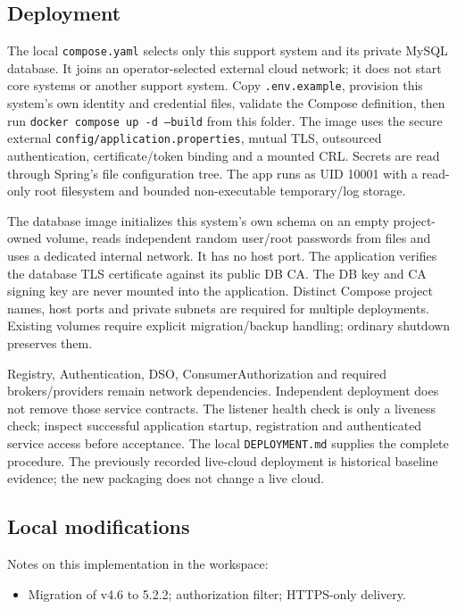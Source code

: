 \documentclass[a4paper]{arrowhead}
\begin{document}
\subsection{Deployment}

The local \texttt{compose.yaml} selects only this support system and its private MySQL database. It joins an operator-selected external cloud network; it does not start core systems or another support system. Copy \texttt{.env.example}, provision this system's own identity and credential files, validate the Compose definition, then run \texttt{docker compose up -d --build} from this folder. The image uses the secure external \texttt{config/application.properties}, mutual TLS, outsourced authentication, certificate/token binding and a mounted CRL. Secrets are read through Spring's file configuration tree. The app runs as UID 10001 with a read-only root filesystem and bounded non-executable temporary/log storage.

The database image initializes this system's own schema on an empty project-owned volume, reads independent random user/root passwords from files and uses a dedicated internal network. It has no host port. The application verifies the database TLS certificate against its public DB CA. The DB key and CA signing key are never mounted into the application. Distinct Compose project names, host ports and private subnets are required for multiple deployments. Existing volumes require explicit migration/backup handling; ordinary shutdown preserves them.

Registry, Authentication, DSO, ConsumerAuthorization and required brokers/providers remain network dependencies. Independent deployment does not remove those service contracts. The listener health check is only a liveness check; inspect successful application startup, registration and authenticated service access before acceptance. The local \texttt{DEPLOYMENT.md} supplies the complete procedure. The previously recorded live-cloud deployment is historical baseline evidence; the new packaging does not change a live cloud.

\subsection{Local modifications}
\label{sec:local}

Notes on this implementation in the workspace:
\begin{itemize}
  \item Migration of v4.6 to 5.2.2; authorization filter; HTTPS-only delivery.
\end{itemize}
\end{document}
